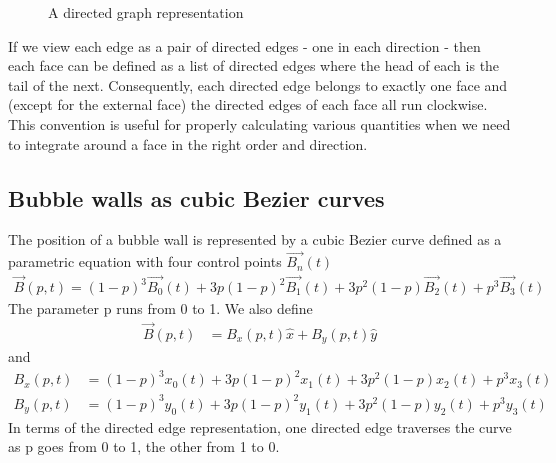 \documentclass{article}
\begin{document}
\begin{figure}[h]
\centering
{}
\caption{A directed graph representation}
\end{figure}

If we view each edge as a pair of directed edges - one in each direction - then
each face can be defined as a list of directed edges where the head of each
is the tail of the next. Consequently, each directed edge belongs to exactly
one face and (except for the external face) the directed edges of each face all
run clockwise. This convention is useful for properly calculating various quantities
when we need to integrate around a face in the right order and direction.
\subsection{Bubble walls as cubic Bezier curves}
The position of a bubble wall is represented by a cubic Bezier curve defined as
a parametric equation with four control points $\vec{B_n}(t)$
\begin{align}
\vec{B}(p,t)=(1-p)^3\vec{B_0}(t)+3p(1-p)^2\vec{B_1}(t)+3p^2(1-p)\vec{B_2}(t)+p^3\vec{B_3}(t)
\end{align}
The parameter p runs from 0 to 1. We also define
\begin{align}
\vec{B}(p,t)&=B_x(p,t)\hat{x} +B_y(p,t)\hat{y}
\end{align}
and
\begin{subequations}
\begin{align}
B_x(p,t)&=(1-p)^3x_0(t)+3p(1-p)^2x_1(t)+3p^2(1-p)x_2(t)+p^3x_3(t)\\
B_y(p,t)&=(1-p)^3y_0(t)+3p(1-p)^2y_1(t)+3p^2(1-p)y_2(t)+p^3y_3(t)
\end{align}
\end{subequations}
In terms of the directed edge representation, one directed edge traverses the
curve as p goes from 0 to 1, the other from 1 to 0.
\clearpage
\end{document}
